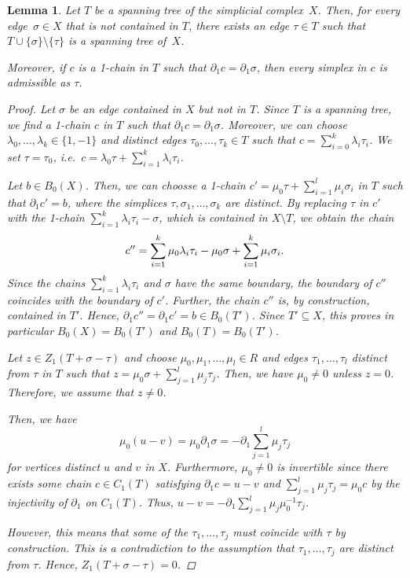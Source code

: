 \documentclass[oneside]{amsart}
\newtheorem{lemma}[theorem]{Lemma}
\theoremstyle{definition}
\begin{document}
\begin{lemma}%
    \label{lemma:STEdgeExchange}
    Let $T$ be a spanning tree of the simplicial complex~$X$.
    Then, for every edge~$\sigma \in X$ that is not contained in $T$, there exists an edge $\tau \in T$ such that $T \cup \{ \sigma \} \setminus \{ \tau \}$ is a spanning tree of~$X$.

    Moreover, if $c$ is a 1-chain in $T$ such that $\partial_1 c = \partial_1 \sigma$, then every simplex in $c$ is admissible as $\tau$.

    \begin{proof}
        Let $\sigma$ be an edge contained in $X$ but not in $T$.
        Since $T$ is a spanning tree, we find a 1-chain $c$ in $T$ such that $\partial_1 c = \partial_1 \sigma$.
        Moreover, we can choose $\lambda_0, \dotsc, \lambda_k \in \{ 1, -1 \}$ and distinct edges $\tau_0, \dotsc, \tau_k \in T$ such that $c = \sum_{i = 0}^k \lambda_i \tau_i$.
        We set $\tau = \tau_0$, i.e.\ $c = \lambda_0 \tau + \sum_{i = 1}^k \lambda_i \tau_i$.
    
        Let $b \in B_0(X)$.
        Then, we can choosse a 1-chain $c' = \mu_0 \tau + \sum_{i = 1}^l \mu_i \sigma_i$ in $T$ such that $\partial_1 c' = b$, where the simplices $\tau, \sigma_1, \dotsc, \sigma_k$ are distinct.
        By replacing $\tau$ in $c'$ with the 1-chain $\sum_{i = 1}^k \lambda_i \tau_i - \sigma$, which is contained in $X \setminus T$, we obtain the chain
        \[ c'' = \sum_{i = 1}^k \mu_0 \lambda_i \tau_i - \mu_0 \sigma + \sum_{i = 1}^k \mu_i \sigma_i \text. \]
        Since the chains $\sum_{i = 1}^k \lambda_i \tau_i$ and $\sigma$ have the same boundary, the boundary of $c''$ coincides with the boundary of $c'$.
        Further, the chain $c''$ is, by construction, contained in $T'$.
        Hence, $\partial_1 c'' = \partial_1 c' = b \in B_0(T')$.
        Since $T' \subseteq X$, this proves in particular $B_0(X) = B_0(T')$ and $B_0(T) = B_0(T')$.
    
        Let $z \in Z_1(T + \sigma - \tau)$ and choose $\mu_0, \mu_1, \dotsc, \mu_l \in R$ and edges $\tau_1, \dotsc, \tau_l$ distinct from $\tau$ in $T$ such that $z = \mu_0 \sigma + \sum_{j = 1}^l \mu_j \tau_j$.
        Then, we have $\mu_0 \neq 0$ unless $z = 0$.
        Therefore, we assume that $z \neq 0$.
        
        Then, we have
        \[ \mu_0 (u - v) = \mu_0 \partial_1 \sigma = -\partial_1 \sum_{j = 1}^l \mu_j \tau_j  \]
        for vertices distinct $u$ and $v$ in $X$.
        Furthermore, $\mu_0 \neq 0$ is invertible since there exists some chain $c \in C_1(T)$ satisfying $\partial_1 c = u - v$ and $\sum_{j = 1}^l \mu_j \tau_j = \mu_0 c$ by the injectivity of $\partial_1$ on $C_1(T)$.
        Thus, $u - v = -\partial_1 \sum_{j = 1}^l \mu_j \mu_0^{-1} \tau_j$.
        
        However, this means that some of the $\tau_1, \dotsc, \tau_j$ must coincide with $\tau$ by construction.
        This is a contradiction to the assumption that $\tau_1, \dotsc, \tau_j$ are distinct from $\tau$.
        Hence, $Z_1(T + \sigma - \tau) = 0$.
    \end{proof}    
\end{lemma}
\end{document}
